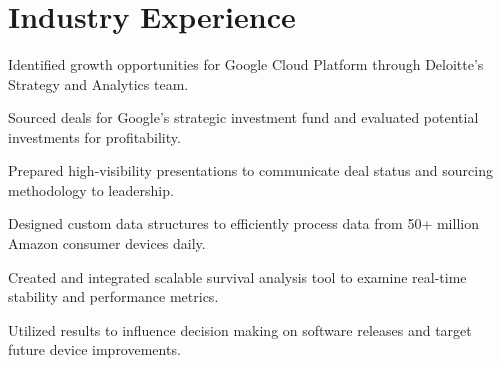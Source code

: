 \documentclass[]{single_column_resume}
\begin{document}
\\
\\
\\

{\setlength{\parindent}{0cm}}
\sectionsep


\section{Industry Experience}

\noindent{}
\hfill {}
\begin{tightemize}
    \item Identified growth opportunities for Google Cloud Platform through Deloitte’s Strategy and Analytics team.
    \item Sourced deals for Google’s strategic investment fund and evaluated potential investments for profitability. 
    \item Prepared high-visibility presentations to communicate deal status and sourcing methodology to leadership.
\end{tightemize}
\sectionsep

\noindent{}
\hfill {}
\begin{tightemize}
    \item Designed custom data structures to efficiently process data from 50+ million Amazon consumer devices daily.
    \item Created and integrated scalable survival analysis tool to examine real-time stability and performance metrics.
    \item Utilized results to influence decision making on software releases and target future device improvements.
\end{tightemize}
\sectionsep
\end{document}
